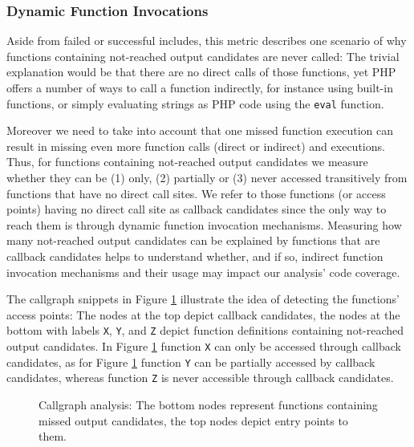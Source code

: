 \documentclass[sigconf]{acmart}
\renewcommand{\tt}[1]{\texttt{#1}}
\begin{document}
\subsubsection{Dynamic Function Invocations}
\label{WhyDidFunctionCallsFail}
Aside from failed or successful includes, this metric describes one scenario of
why functions containing not-reached output candidates are never called: The
trivial explanation would be that there are no direct calls of those functions,
yet PHP offers a number of ways to call a function indirectly, for instance
using built-in functions, or simply evaluating strings as PHP code using the
\texttt{eval} function.

Moreover we need to take into account that one missed function execution can
result in missing even more function calls (direct or indirect) and executions.
Thus, for functions containing not-reached output candidates we measure whether
they can be (1) only, (2) partially or (3) never accessed transitively from
functions that have no direct call sites. We refer to those functions (or
access points) having no direct call site as callback candidates since the only
way to reach them is through dynamic function invocation mechanisms. Measuring
how many not-reached output candidates can be explained by functions that are callback
candidates helps to understand whether, and if so, indirect function invocation
mechanisms and their usage may impact our analysis’ code coverage.

The callgraph snippets in Figure \ref{fig:callgraph} illustrate the idea of
detecting the functions’ access points: The nodes at the top depict callback
candidates, the nodes at the bottom with labels \tt{X}, \tt{Y}, and \tt{Z}
depict function definitions containing not-reached output candidates. In Figure
\ref{fig:callgraph} function \tt{X} can only be accessed through callback
candidates, as for Figure \ref{fig:callgraph} function \tt{Y} can be partially
accessed by callback candidates, whereas function \tt{Z} is never accessible
through callback candidates.

\begin{figure}
    
    \caption{Callgraph analysis: The bottom nodes represent functions
    containing missed output candidates, the top nodes depict entry points to
    them.}
    \label{fig:callgraph} 
\end{figure}
\end{document}
